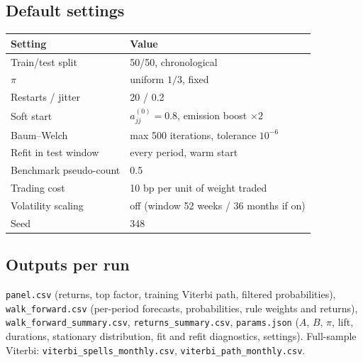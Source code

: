 \documentclass[11pt]{article}
\begin{document}
\subsection*{Default settings}
\begin{center}
\begin{tabular}{ll}
\toprule
Setting & Value \\
\midrule
Train/test split & 50/50, chronological \\
$\pi$ & uniform $1/3$, fixed \\
Restarts / jitter & 20 / 0.2 \\
Soft start & $a^{(0)}_{jj}=0.8$, emission boost $\times2$ \\
Baum--Welch & max 500 iterations, tolerance $10^{-6}$ \\
Refit in test window & every period, warm start \\
Benchmark pseudo-count & 0.5 \\
Trading cost & 10 bp per unit of weight traded \\
Volatility scaling & off (window 52 weeks / 36 months if on) \\
Seed & 348 \\
\bottomrule
\end{tabular}
\end{center}

\subsection*{Outputs per run}
\sloppy\texttt{panel.csv} (returns, top factor, training Viterbi path, filtered probabilities), \texttt{walk\_forward.csv} (per-period forecasts, probabilities, rule weights and returns), \texttt{walk\_forward\_summary.csv}, \texttt{returns\_summary.csv}, \texttt{params.json} ($A$, $B$, $\pi$, lift, durations, stationary distribution, fit and refit diagnostics, settings). Full-sample Viterbi: \texttt{viterbi\_spells\_monthly.csv}, \texttt{viterbi\_path\_monthly.csv}.
\end{document}
